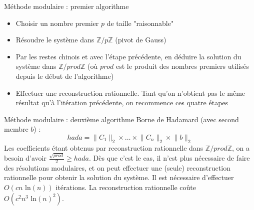 \documentclass[11pt]{beamer}
\begin{document}
	\begin{frame}{Méthode modulaire : premier algorithme}
		\begin{itemize}
			\item Choisir un nombre premier $p$ de taille "raisonnable"
			\item Résoudre le système dans $\mathbb{Z}/p\mathbb{Z}$ (pivot de Gauss)
			\item Par les restes chinois et avec l'étape précédente, en déduire la solution du système dans $\mathbb{Z}/prod\mathbb{Z}$ (où $prod$ est le produit des nombres premiers utilisés depuis le début de l'algorithme)
			\item Effectuer une reconstruction rationnelle. Tant qu'on n'obtient pas le même résultat qu'à l'itération précédente, on recommence ces quatre étapes
		\end{itemize}
	\end{frame}
	
	\begin{frame}{Méthode modulaire : deuxième algorithme}
		Borne de Hadamard (avec second membre $b$) :
		$$ hada = \lVert C_1 \rVert_2 \times \hdots \times \lVert C_n \rVert_2 \times \lVert b \rVert_2$$
		Les coefficients étant obtenus par reconstruction rationnelle dans $\mathbb{Z}/prod\mathbb{Z}$, on a besoin d'avoir $\frac{\sqrt{prod}}{2} \geq hada $.
		Dès que c'est le cas, il n'est plus nécessaire de faire des résolutions modulaires, et on peut effectuer une (seule) reconstruction rationnelle pour obtenir la solution du système.
		\newline
		Il est nécessaire d'effectuer $O(cn \mbox{ ln}(n))$ itérations. 
		\newline
		La reconstruction rationnelle coûte $O(c^2n^3 \mbox{ ln}(n)^2)$.
	\end{frame}
	
\end{document}
